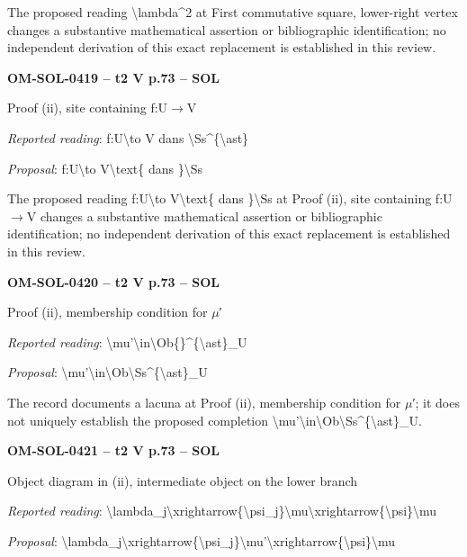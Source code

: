 The proposed reading \textbackslash{}lambda\textasciicircum{}2 at First commutative square, lower-right vertex changes a substantive mathematical assertion or bibliographic identification; no independent derivation of this exact replacement is established in this review.\par
\par\noindent\textbf{OM-SOL-0419 -- t2 V p.73 -- SOL}\par
Proof (ii), site containing f:U\ensuremath{\to}V\par
\emph{Reported reading}: f:U\textbackslash{}to V dans \textbackslash{}Ss\textasciicircum{}\{\textbackslash{}ast\}\par
\emph{Proposal}: f:U\textbackslash{}to V\textbackslash{}text\{ dans \}\textbackslash{}Ss\par
The proposed reading f:U\textbackslash{}to V\textbackslash{}text\{ dans \}\textbackslash{}Ss at Proof (ii), site containing f:U\ensuremath{\to}V changes a substantive mathematical assertion or bibliographic identification; no independent derivation of this exact replacement is established in this review.\par
\par\noindent\textbf{OM-SOL-0420 -- t2 V p.73 -- SOL}\par
Proof (ii), membership condition for \ensuremath{\mu}′\par
\emph{Reported reading}: \textbackslash{}mu'\textbackslash{}in\textbackslash{}Ob\{\}\textasciicircum{}\{\textbackslash{}ast\}\_U\par
\emph{Proposal}: \textbackslash{}mu'\textbackslash{}in\textbackslash{}Ob\textbackslash{}Ss\textasciicircum{}\{\textbackslash{}ast\}\_U\par
The record documents a lacuna at Proof (ii), membership condition for \ensuremath{\mu}′; it does not uniquely establish the proposed completion \textbackslash{}mu'\textbackslash{}in\textbackslash{}Ob\textbackslash{}Ss\textasciicircum{}\{\textbackslash{}ast\}\_U.\par
\par\noindent\textbf{OM-SOL-0421 -- t2 V p.73 -- SOL}\par
Object diagram in (ii), intermediate object on the lower branch\par
\emph{Reported reading}: \textbackslash{}lambda\_j\textbackslash{}xrightarrow\{\textbackslash{}psi\_j\}\textbackslash{}mu\textbackslash{}xrightarrow\{\textbackslash{}psi\}\textbackslash{}mu\par
\emph{Proposal}: \textbackslash{}lambda\_j\textbackslash{}xrightarrow\{\textbackslash{}psi\_j\}\textbackslash{}mu'\textbackslash{}xrightarrow\{\textbackslash{}psi\}\textbackslash{}mu\par
